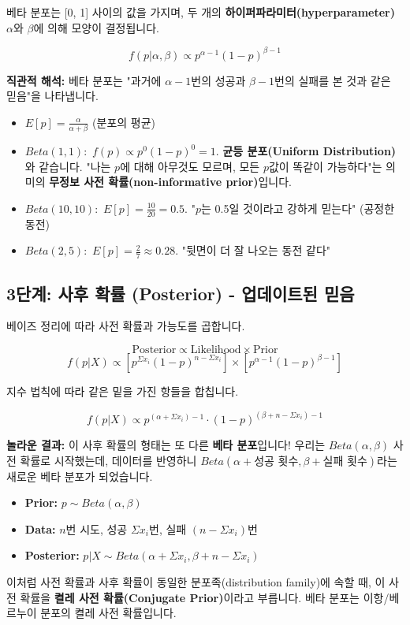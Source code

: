 \documentclass[11pt,a4paper]{book}
\theoremstyle{definition}
\begin{document}
\begin{defbox}[title=베타 분포 $Beta(\alpha, \beta)$]
베타 분포는 [0, 1] 사이의 값을 가지며, 두 개의 \textbf{하이퍼파라미터(hyperparameter)} $\alpha$와 $\beta$에 의해 모양이 결정됩니다.

$$ f(p | \alpha, \beta) \propto p^{\alpha-1} (1-p)^{\beta-1} $$

\textbf{직관적 해석:}
베타 분포는 "과거에 $\alpha-1$번의 성공과 $\beta-1$번의 실패를 본 것과 같은 믿음"을 나타냅니다.
\begin{itemize}
    \item $E[p] = \frac{\alpha}{\alpha + \beta}$ (분포의 평균)
    \item $Beta(1, 1):$ $f(p) \propto p^0 (1-p)^0 = 1$. \textbf{균등 분포(Uniform Distribution)}와 같습니다.
    "나는 $p$에 대해 아무것도 모르며, 모든 $p$값이 똑같이 가능하다"는 의미의 \textbf{무정보 사전 확률(non-informative prior)}입니다.
    \item $Beta(10, 10):$ $E[p] = \frac{10}{20} = 0.5$. "$p$는 0.5일 것이라고 강하게 믿는다" (공정한 동전)
    \item $Beta(2, 5):$ $E[p] = \frac{2}{7} \approx 0.28$. "뒷면이 더 잘 나오는 동전 같다"
\end{itemize}
\end{defbox}

\subsection{3단계: 사후 확률 (Posterior) - 업데이트된 믿음}

베이즈 정리에 따라 사전 확률과 가능도를 곱합니다.

$$ \text{Posterior} \propto \text{Likelihood} \times \text{Prior} $$
$$ f(p | X) \propto [p^{\Sigma x_i} (1-p)^{n - \Sigma x_i}] \times [p^{\alpha-1} (1-p)^{\beta-1}] $$

지수 법칙에 따라 같은 밑을 가진 항들을 합칩니다.

$$ f(p | X) \propto p^{(\alpha + \Sigma x_i) - 1} \cdot (1-p)^{(\beta + n - \Sigma x_i) - 1} $$

\textbf{놀라운 결과:} 이 사후 확률의 형태는 또 다른 \textbf{베타 분포}입니다!
우리는 $Beta(\alpha, \beta)$ 사전 확률로 시작했는데, 데이터를 반영하니 $Beta(\alpha + \text{성공 횟수}, \beta + \text{실패 횟수})$라는 새로운 베타 분포가 되었습니다.

\begin{summarybox}[title=베타-이항 모델 업데이트 규칙]
\begin{itemize}
    \item \textbf{Prior:} $p \sim Beta(\alpha, \beta)$
    \item \textbf{Data:} $n$번 시도, 성공 $\Sigma x_i$번, 실패 $(n - \Sigma x_i)$번
    \item \textbf{Posterior:} $p | X \sim Beta(\alpha + \Sigma x_i, \beta + n - \Sigma x_i)$
\end{itemize}

이처럼 사전 확률과 사후 확률이 동일한 분포족(distribution family)에 속할 때, 이 사전 확률을 \textbf{켤레 사전 확률(Conjugate Prior)}이라고 부릅니다.
베타 분포는 이항/베르누이 분포의 켤레 사전 확률입니다.
\end{summarybox}
\end{document}
